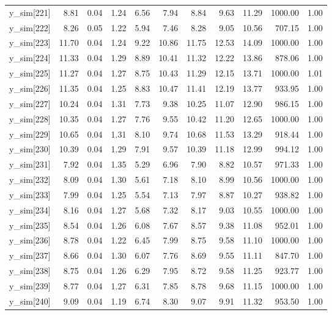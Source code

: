 \begin{table}[ht]
\begin{tabular}{rrrrrrrrrrr}
  y\_sim[221] & 8.81 & 0.04 & 1.24 & 6.56 & 7.94 & 8.84 & 9.63 & 11.29 & 1000.00 & 1.00 \\ 
  y\_sim[222] & 8.26 & 0.05 & 1.22 & 5.94 & 7.46 & 8.28 & 9.05 & 10.56 & 707.15 & 1.00 \\ 
  y\_sim[223] & 11.70 & 0.04 & 1.24 & 9.22 & 10.86 & 11.75 & 12.53 & 14.09 & 1000.00 & 1.00 \\ 
  y\_sim[224] & 11.33 & 0.04 & 1.29 & 8.89 & 10.41 & 11.32 & 12.22 & 13.86 & 878.06 & 1.00 \\ 
  y\_sim[225] & 11.27 & 0.04 & 1.27 & 8.75 & 10.43 & 11.29 & 12.15 & 13.71 & 1000.00 & 1.01 \\ 
  y\_sim[226] & 11.35 & 0.04 & 1.25 & 8.83 & 10.47 & 11.41 & 12.19 & 13.77 & 933.95 & 1.00 \\ 
  y\_sim[227] & 10.24 & 0.04 & 1.31 & 7.73 & 9.38 & 10.25 & 11.07 & 12.90 & 986.15 & 1.00 \\ 
  y\_sim[228] & 10.35 & 0.04 & 1.27 & 7.76 & 9.55 & 10.42 & 11.20 & 12.65 & 1000.00 & 1.00 \\ 
  y\_sim[229] & 10.65 & 0.04 & 1.31 & 8.10 & 9.74 & 10.68 & 11.53 & 13.29 & 918.44 & 1.00 \\ 
  y\_sim[230] & 10.39 & 0.04 & 1.29 & 7.91 & 9.57 & 10.39 & 11.18 & 12.99 & 994.12 & 1.00 \\ 
  y\_sim[231] & 7.92 & 0.04 & 1.35 & 5.29 & 6.96 & 7.90 & 8.82 & 10.57 & 971.33 & 1.00 \\ 
  y\_sim[232] & 8.09 & 0.04 & 1.30 & 5.61 & 7.18 & 8.10 & 8.99 & 10.56 & 1000.00 & 1.00 \\ 
  y\_sim[233] & 7.99 & 0.04 & 1.25 & 5.54 & 7.13 & 7.97 & 8.87 & 10.27 & 938.82 & 1.00 \\ 
  y\_sim[234] & 8.16 & 0.04 & 1.27 & 5.68 & 7.32 & 8.17 & 9.03 & 10.55 & 1000.00 & 1.00 \\ 
  y\_sim[235] & 8.54 & 0.04 & 1.26 & 6.08 & 7.67 & 8.57 & 9.38 & 11.08 & 952.01 & 1.00 \\ 
  y\_sim[236] & 8.78 & 0.04 & 1.22 & 6.45 & 7.99 & 8.75 & 9.58 & 11.10 & 1000.00 & 1.00 \\ 
  y\_sim[237] & 8.66 & 0.04 & 1.30 & 6.07 & 7.76 & 8.69 & 9.55 & 11.11 & 847.70 & 1.00 \\ 
  y\_sim[238] & 8.75 & 0.04 & 1.26 & 6.29 & 7.95 & 8.72 & 9.58 & 11.25 & 923.77 & 1.00 \\ 
  y\_sim[239] & 8.77 & 0.04 & 1.27 & 6.31 & 7.85 & 8.78 & 9.68 & 11.15 & 1000.00 & 1.00 \\ 
  y\_sim[240] & 9.09 & 0.04 & 1.19 & 6.74 & 8.30 & 9.07 & 9.91 & 11.32 & 953.50 & 1.00 \\ 

\end{tabular}
\end{table}

